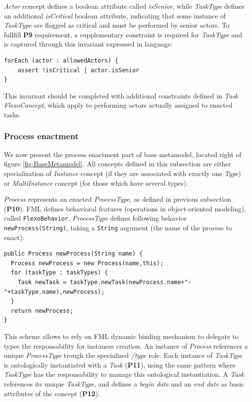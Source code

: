 \textit{Actor} concept defines a boolean attribute called \textit{isSenior}, while \textit{TaskType} defines an additional \textit{isCritical} boolean attribute, indicating that some instance of \textit{TaskType} are flagged as critical and must be performed by senior actors. To fullfill \textbf{P9} requirement, a supplementary constraint is required for \textit{TaskType} and is captured through this invariant expressed in \FML language:

\begin{lstlisting}
forEach (actor : allowedActors) {
    assert !isCritical | actor.isSenior
}
\end{lstlisting}

This invariant should be completed with additional constraints defined in \textit{Task} \textit{FlexoConcept}, which apply to performing actors actually assigned to enacted tasks. 


\subsubsection{Process enactment}
\label{sec:ProcessEnactment}
We now present the process enactment part of base metamodel, located right of figure \ref{fig:BaseMetamodel}. All concepts defined in this subsection are either specialization of \textit{Instance} concept (if they are associated with exactly one \textit{Type}) or \textit{MultiInstance} concept (for those which have several types).

\textit{Process} represents an enacted \textit{ProcessType}, as defined in previous subsection (\textbf{P10}). FML defines behavioral features (operations in object-oriented modeling), called \texttt{FlexoBehavior}. \textit{ProcessType} defines following behavior \texttt{newProcess(String)}, taking a \texttt{String} argument (the name of the process to enact):

\begin{lstlisting}
public Process newProcess(String name) {    
  Process newProcess = new Process(name,this);  
  for (taskType : taskTypes) {      
    Task newTask = taskType.newTask(newProcess.name+"-"+taskType.name),newProcess);        
  }      
  return newProcess;    
}    
\end{lstlisting}

This scheme allows to rely on FML dynamic binding mechanism to delegate to types the responsability for instances creation. An instance of \textit{Process} references a unique \textit{ProcessType} trough the specialized \textit{/type} role. Each instance of \textit{TaskType} is ontologically instantiated with a \textit{Task} (\textbf{P11}), using the same pattern where \textit{TaskType} has the responsability to manage this ontological instantiation. A \textit{Task} references its unique \textit{TaskType}, and defines a \textit{begin date} and an \textit{end date} as basic attributes of the concept (\textbf{P12}).

